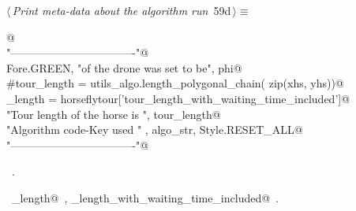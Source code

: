 \documentclass[11.5pt]{report}
\begin{document}
\vspace{-0.8cm} \newchunk
\begin{flushleft} \small
\begin{minipage}{\linewidth}\label{scrap90}\raggedright\small
{} $\langle\,${\itshape Print meta-data about the algorithm run}\nobreak\ {\footnotesize {59d}}$\,\rangle\equiv$
\vspace{-1ex}
\begin{list}{}{} \item
\mbox{}\verb@   @\\
\mbox{}\verb@print "----------------------------------"@\\
\mbox{}\verb@print Fore.GREEN, "\nSpeed of the drone was set to be", phi@\\
\mbox{}\verb@#tour_length = utils_algo.length_polygonal_chain( zip(xhs, yhs))@\\
\mbox{}\verb@tour_length = horseflytour['tour_length_with_waiting_time_included']@\\
\mbox{}\verb@print "Tour length of the horse is ",  tour_length@\\
\mbox{}\verb@print "Algorithm code-Key used "    , algo_str, Style.RESET_ALL@\\
\mbox{}\verb@print "----------------------------------\n"@\\
\mbox{}\verb@@{\NWsep}
\end{list}
\vspace{-1.5ex}
\footnotesize
\begin{list}{}{\setlength{\itemsep}{-\parsep}\setlength{\itemindent}{-\leftmargin}}
\item \NWtxtMacroRefIn\ .
\item \NWtxtIdentsUsed\nobreak\  \verb@tour_length@\nobreak\ , \verb@tour_length_with_waiting_time_included@\nobreak\ .
\item{}
\end{list}
\end{minipage}\vspace{4ex}
\end{flushleft}
\end{document}
